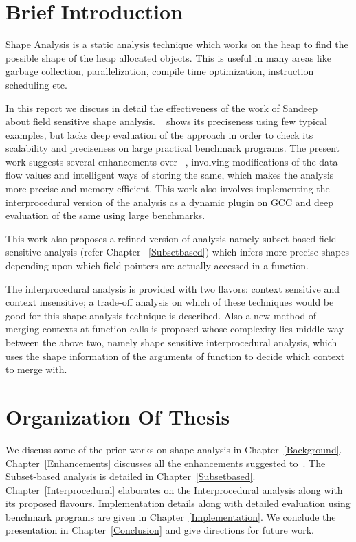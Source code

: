 
\section{Brief Introduction}

Shape Analysis is  a static analysis technique which works on the heap to find the possible shape of the heap allocated objects.
This is useful in  many areas like garbage collection, parallelization, compile time optimization, instruction scheduling etc. 

In this report we discuss in detail the effectiveness of the work of Sandeep ~\cite{Sandeep} about field sensitive shape analysis.
~\cite{Sandeep} shows its preciseness using few typical examples, but lacks deep evaluation of the approach in order to check 
its scalability and preciseness on large practical benchmark programs. The present work suggests several enhancements over ~\cite{Sandeep},
involving modifications of the data flow values and intelligent ways of storing the same, which makes the analysis more precise and memory 
efficient. This work also involves implementing the interprocedural version of the analysis as a dynamic plugin on GCC and deep evaluation of the
same using large benchmarks.

This work also proposes a refined version of analysis namely subset-based field sensitive analysis (refer Chapter ~\ref{Subsetbased}) which 
infers more precise shapes depending upon which field pointers are actually accessed in a function. 

The interprocedural analysis is provided with two flavors: context sensitive and context insensitive; a trade-off analysis
on which of these techniques would be good for this shape analysis technique is described.
Also a new method of merging contexts at function calls is proposed whose complexity lies middle way between the above two, namely
shape sensitive interprocedural analysis, which uses the shape information of
the arguments of function to decide which context to merge with.

\section{Organization Of Thesis}
We discuss some of the prior works on shape analysis in
Chapter~\ref{Background}. Chapter~\ref{Enhancements} discusses all the enhancements suggested to~\cite{Sandeep}.
The Subset-based analysis is detailed in Chapter~\ref{Subsetbased}. 
Chapter~\ref{Interprocedural} elaborates on the Interprocedural analysis along with its proposed flavours.
Implementation details along with detailed evaluation using benchmark programs are given in Chapter~\ref{Implementation}.
We conclude the presentation in Chapter~\ref{Conclusion} and give directions for future work.
